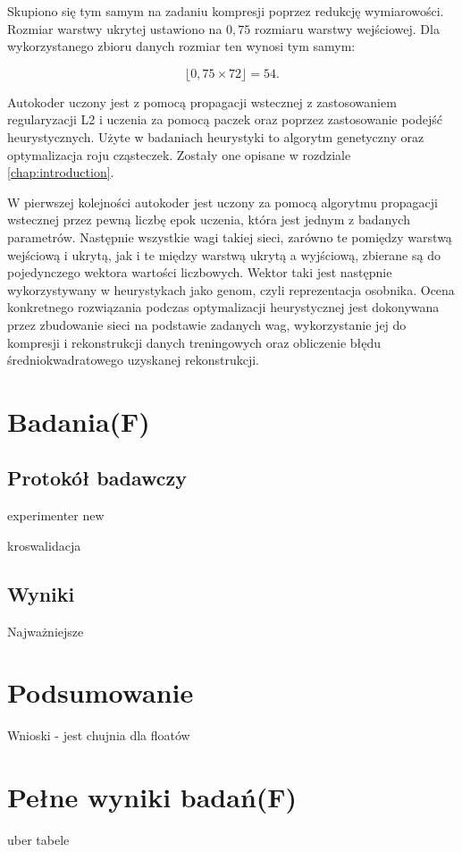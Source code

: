\documentclass[11pt,a4paper,oneside]{report}
\begin{document}
Skupiono się tym samym na zadaniu kompresji poprzez redukcję wymiarowości. Rozmiar warstwy ukrytej ustawiono na $0,75$ rozmiaru warstwy wejściowej. Dla wykorzystanego zbioru danych rozmiar ten wynosi tym samym:

\begin{equation}
\lfloor 0,75 \times 72 \rfloor = 54 .
\end{equation}

Autokoder uczony jest z pomocą propagacji wstecznej z zastosowaniem regularyzacji L2 i uczenia za pomocą paczek oraz poprzez zastosowanie podejść heurystycznych. Użyte w badaniach heurystyki to algorytm genetyczny oraz optymalizacja roju cząsteczek. Zostały one opisane w rozdziale \ref{chap:introduction}. 

W pierwszej kolejności autokoder jest uczony za pomocą algorytmu propagacji wstecznej przez pewną liczbę epok uczenia, która jest jednym z badanych parametrów. Następnie wszystkie wagi takiej sieci, zarówno te pomiędzy warstwą wejściową i ukrytą, jak i te między warstwą ukrytą a wyjściową, zbierane są do pojedynczego wektora wartości liczbowych. Wektor taki jest następnie wykorzystywany w heurystykach jako genom, czyli reprezentacja osobnika. Ocena konkretnego rozwiązania podczas optymalizacji heurystycznej jest dokonywana przez zbudowanie sieci na podstawie zadanych wag, wykorzystanie jej do kompresji i rekonstrukcji danych treningowych oraz obliczenie błędu średniokwadratowego uzyskanej rekonstrukcji. 

\chapter{Badania(F)}

\section{Protokół badawczy}

experimenter new

kroswalidacja

\section{Wyniki}

Najważniejsze

\chapter{Podsumowanie}

Wnioski - jest chujnia dla floatów





\appendix 
\chapter{Pełne wyniki badań(F)}

uber tabele
\end{document}
